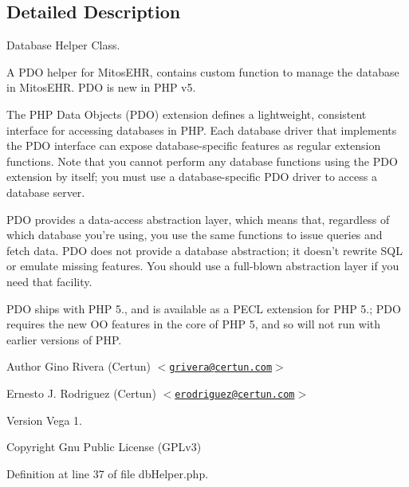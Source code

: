 \subsection{\-Detailed \-Description}
\-Database \-Helper \-Class. 

\-A \-P\-D\-O helper for \-Mitos\-E\-H\-R, contains custom function to manage the database in \-Mitos\-E\-H\-R. \-P\-D\-O is new in \-P\-H\-P v5.

\-The \-P\-H\-P \-Data \-Objects (\-P\-D\-O) extension defines a lightweight, consistent interface for accessing databases in \-P\-H\-P. \-Each database driver that implements the \-P\-D\-O interface can expose database-\/specific features as regular extension functions. \-Note that you cannot perform any database functions using the \-P\-D\-O extension by itself; you must use a database-\/specific \-P\-D\-O driver to access a database server.

\-P\-D\-O provides a data-\/access abstraction layer, which means that, regardless of which database you're using, you use the same functions to issue queries and fetch data. \-P\-D\-O does not provide a database abstraction; it doesn't rewrite \-S\-Q\-L or emulate missing features. \-You should use a full-\/blown abstraction layer if you need that facility.

\-P\-D\-O ships with \-P\-H\-P 5., and is available as a \-P\-E\-C\-L extension for \-P\-H\-P 5.; \-P\-D\-O requires the new \-O\-O features in the core of \-P\-H\-P 5, and so will not run with earlier versions of \-P\-H\-P.

\begin{DoxyAuthor}{\-Author}
\-Gino \-Rivera (\-Certun) $<$\href{mailto:grivera@certun.com}{\tt grivera@certun.\-com}$>$ 

\-Ernesto \-J. \-Rodriguez (\-Certun) $<$\href{mailto:erodriguez@certun.com}{\tt erodriguez@certun.\-com}$>$ 
\end{DoxyAuthor}
\begin{DoxyVersion}{\-Version}
\-Vega 1. 
\end{DoxyVersion}
\begin{DoxyCopyright}{\-Copyright}
\-Gnu \-Public \-License (\-G\-P\-Lv3) 
\end{DoxyCopyright}


\-Definition at line 37 of file db\-Helper.\-php.



